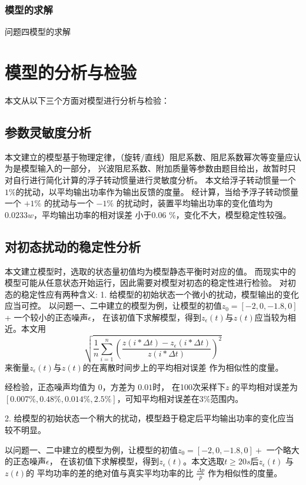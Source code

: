 \documentclass[withoutpreface,bwprint]{cumcmthesis} %
\begin{document}
    \subsubsection{模型的求解}
    问题四模型的求解
    \newpage
    \section{模型的分析与检验}
    本文从以下三个方面对模型进行分析与检验：
    \subsection{参数灵敏度分析}
    本文建立的模型基于物理定律，（旋转/直线）阻尼系数、阻尼系数幂次等变量应认为是模型输入的一部分，
    兴波阻尼系数、附加质量等参数由题目给出，故暂时只对自行进行简化计算的浮子转动惯量进行灵敏度分析。
    本文给浮子转动惯量一个$ 1\% $的扰动，以平均输出功率作为输出反馈的度量。
    经计算，当给予浮子转动惯量一个 $+1\%$ 的扰动与一个 $-1\%$ 的扰动时，装置平均输出功率的变化值均为$0.0233w$，平均输出功率的相对误差 
    小于0.06 \%，变化不大，模型稳定性较强。
    
    \subsection{对初态扰动的稳定性分析}
    本文建立模型时，选取的状态量初值均为模型静态平衡时对应的值。
    而现实中的模型可能从任意状态开始运行，因此需要对模型对初态的稳定性进行检验。
    对初态的稳定性应有两种含义:
    1. 给模型的初始状态一个微小的扰动，模型输出的变化应当可控。
       以问题一、二中建立的模型为例，让模型的初值$ z_0 = [-2, 0, -1.8, 0] $ + 一个较小的正态噪声$\epsilon$，
       在该初值下求解模型，得到$ z_{\epsilon}(t) $与$ z(t) $应当较为相近。本文用
        $$
        \sqrt{\frac{1}{n}\sum\limits_{i=1}^n(\frac{z(i * \Delta t) - z_{\epsilon}(i * \Delta t)}{z(i * \Delta t)} )^2}
        $$
    来衡量$ z_{\epsilon}(t) $与$ z(t) $的在离散时间步上的平均相对误差
       作为相似性的度量。

       经检验，正态噪声均值为 $0$，方差为 $0.01$时， 在100次采样下$z$ 的平均相对误差为 $[0.007\%,0.48\%,0.014\%,2.5\%]$，可知平均相对误差在$3\%$范围内。

    2. 给模型的初始状态一个稍大的扰动，模型趋于稳定后平均输出功率的变化应当较不明显。
        
        以问题一、二中建立的模型为例，让模型的初值$ z_0 = [-2, 0, -1.8, 0] + $ 一个略大的正态噪声$\epsilon$，
        在该初值下求解模型，得到$ z_{\epsilon}(t) $。本文选取$ t \geq 20s $后$ z_{\epsilon}(t) $
        与$ z(t) $的 平均功率的差的绝对值与真实平均功率的比 $\frac{\Delta p}{p}$ 作为相似性的度量。
\end{document}
